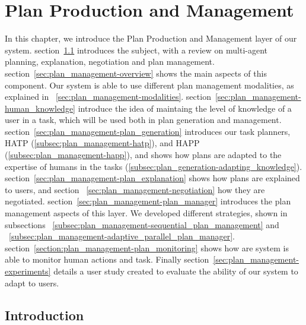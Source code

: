 
\chapter{Plan Production and Management} %

\label{chapter:plan_management} %


In this chapter, we introduce the Plan Production and Management layer of our system. section~\ref{sec:plan_management-intro} introduces the subject, with a review on multi-agent planning, explanation, negotiation and plan management. section~\ref{sec:plan_management-overview} shows the main aspects of this component. Our system is able to use different plan management modalities, as explained in ~\ref{sec:plan_management-modalities}. section~\ref{sec:plan_management-human_knowledge} introduce the idea of maintaing the level of knowledge of a user in a task, which will be used both in plan generation and management. section~\ref{sec:plan_management-plan_generation} introduces our task planners, HATP (\ref{subsec:plan_management-hatp}), and HAPP (\ref{subsec:plan_management-happ}), and shows how plans are adapted to the expertise of humans in the  tasks (\ref{subsec:plan_generation-adapting_knowledge}). section~\ref{sec:plan_management-plan_explanation} shows how plans are explained to users, and section ~\ref{sec:plan_management-negotiation} how they are negotiated.  section~\ref{sec:plan_management-plan_manager} introduces the plan management aspects of this layer. We developed different strategies, shown in subsections ~\ref{subsec:plan_management-sequential_plan_management} and ~\ref{subsec:plan_management-adaptive_parallel_plan_manager}. section~\ref{section:plan_management-plan_monitoring} shows how are system is able to monitor human actions and task. Finally section~\ref{sec:plan_management-experiments} details a user study created to evaluate the ability of our system to adapt to users.


\section{Introduction}
\label{sec:plan_management-intro}
